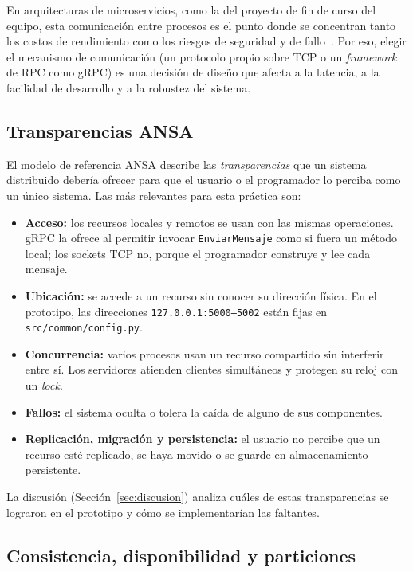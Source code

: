 \documentclass[12pt,a4paper]{article}
\begin{document}
En arquitecturas de microservicios, como la del proyecto de fin de curso del equipo, esta comunicación entre procesos es el punto donde se concentran tanto los costos de rendimiento como los riesgos de seguridad y de fallo~\cite{zhu2025rethinking,haindl2024security}. Por eso, elegir el mecanismo de comunicación (un protocolo propio sobre TCP o un \emph{framework} de RPC como gRPC) es una decisión de diseño que afecta a la latencia, a la facilidad de desarrollo y a la robustez del sistema.

\subsection{Transparencias ANSA}

El modelo de referencia ANSA describe las \emph{transparencias} que un sistema distribuido debería ofrecer para que el usuario o el programador lo perciba como un único sistema. Las más relevantes para esta práctica son:
\begin{itemize}
  \item \textbf{Acceso:} los recursos locales y remotos se usan con las mismas operaciones. gRPC la ofrece al permitir invocar \texttt{EnviarMensaje} como si fuera un método local; los sockets TCP no, porque el programador construye y lee cada mensaje.
  \item \textbf{Ubicación:} se accede a un recurso sin conocer su dirección física. En el prototipo, las direcciones \texttt{127.0.0.1:5000--5002} están fijas en \texttt{src/common/config.py}.
  \item \textbf{Concurrencia:} varios procesos usan un recurso compartido sin interferir entre sí. Los servidores atienden clientes simultáneos y protegen su reloj con un \emph{lock}.
  \item \textbf{Fallos:} el sistema oculta o tolera la caída de alguno de sus componentes.
  \item \textbf{Replicación, migración y persistencia:} el usuario no percibe que un recurso esté replicado, se haya movido o se guarde en almacenamiento persistente.
\end{itemize}
La discusión (Sección~\ref{sec:discusion}) analiza cuáles de estas transparencias se lograron en el prototipo y cómo se implementarían las faltantes.

\subsection{Consistencia, disponibilidad y particiones}
\end{document}
